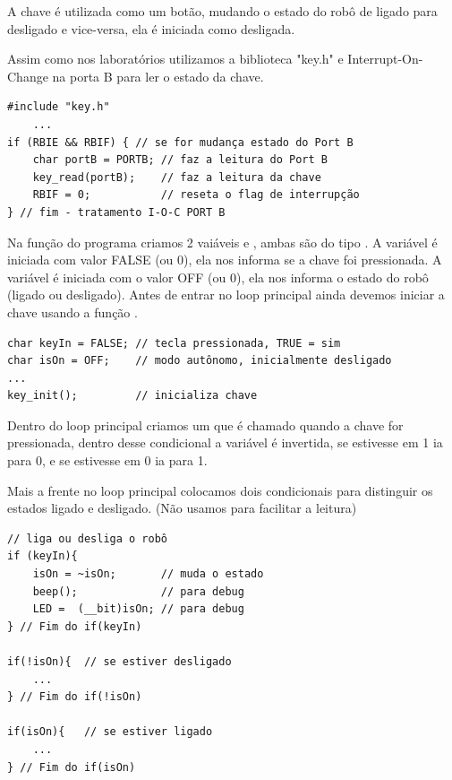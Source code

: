\documentclass{article}
\begin{document}
A chave é utilizada como um botão, mudando o estado do robô de ligado para desligado e vice-versa, ela é iniciada como desligada.\par 
Assim como nos laboratórios utilizamos a biblioteca "key.h" e Interrupt-On-Change na porta B para ler o estado da chave.\par

\begin{lstlisting}[style = Matlab-editor, language = C2]
#include "key.h"
    ...
if (RBIE && RBIF) { // se for mudança estado do Port B        
    char portB = PORTB; // faz a leitura do Port B
    key_read(portB);    // faz a leitura da chave
    RBIF = 0;           // reseta o flag de interrupção 
} // fim - tratamento I-O-C PORT B
\end{lstlisting}

Na função  do programa criamos 2 vaiáveis  e , ambas são do tipo . A variável  é iniciada com valor FALSE (ou 0), ela nos informa se a chave foi pressionada. A variável  é iniciada com o valor OFF (ou 0), ela nos informa o estado do robô (ligado ou desligado). Antes de entrar no loop principal ainda devemos iniciar a chave usando a função .\par

\begin{lstlisting}[style = Matlab-editor, language = C2]
char keyIn = FALSE; // tecla pressionada, TRUE = sim
char isOn = OFF;    // modo autônomo, inicialmente desligado
...
key_init();         // inicializa chave
\end{lstlisting}

Dentro do loop principal criamos um  que é chamado quando a chave for pressionada, dentro desse condicional a variável  é invertida, se estivesse em 1 ia para 0, e se estivesse em 0 ia para 1.\par
Mais a frente no loop principal colocamos dois condicionais  para distinguir os estados ligado e desligado. (Não usamos  para facilitar a leitura)

\begin{lstlisting}[style = Matlab-editor, language = C2]
// liga ou desliga o robô
if (keyIn){
    isOn = ~isOn;       // muda o estado
    beep();             // para debug
    LED =  (__bit)isOn; // para debug
} // Fim do if(keyIn)

if(!isOn){  // se estiver desligado
    ...
} // Fim do if(!isOn)

if(isOn){   // se estiver ligado
    ...
} // Fim do if(isOn)
\end{lstlisting}
\end{document}
